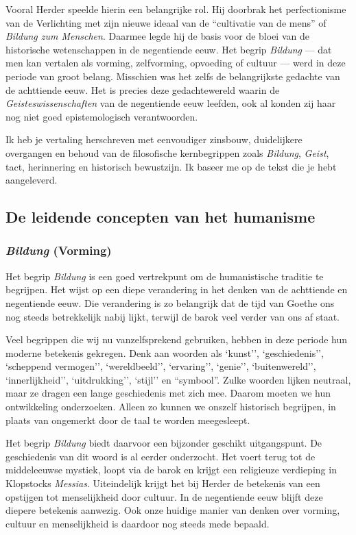 Vooral Herder speelde hierin een belangrijke rol. Hij doorbrak het perfectionisme van de Verlichting met zijn nieuwe ideaal van de ``cultivatie van de mens'' of \textit{Bildung zum Menschen}. Daarmee legde hij de basis voor de bloei van de historische wetenschappen in de negentiende eeuw. Het begrip \textit{Bildung} — dat men kan vertalen als vorming, zelfvorming, opvoeding of cultuur — werd in deze periode van groot belang. Misschien was het zelfs de belangrijkste gedachte van de achttiende eeuw. Het is precies deze gedachtewereld waarin de \textit{Geisteswissenschaften} van de negentiende eeuw leefden, ook al konden zij haar nog niet goed epistemologisch verantwoorden.


Ik heb je vertaling herschreven met eenvoudiger zinsbouw, duidelijkere overgangen en behoud van de filosofische kernbegrippen zoals \textit{Bildung}, \textit{Geist}, tact, herinnering en historisch bewustzijn. Ik baseer me op de tekst die je hebt aangeleverd. 

\subsection{De leidende concepten van het humanisme}

\subsubsection{\textit{Bildung} (Vorming)}

Het begrip \textit{Bildung} is een goed vertrekpunt om de humanistische traditie te begrijpen. Het wijst op een diepe verandering in het denken van de achttiende en negentiende eeuw. Die verandering is zo belangrijk dat de tijd van Goethe ons nog steeds betrekkelijk nabij lijkt, terwijl de barok veel verder van ons af staat.

Veel begrippen die wij nu vanzelfsprekend gebruiken, hebben in deze periode hun moderne betekenis gekregen. Denk aan woorden als `kunst'', `geschiedenis'', `scheppend vermogen'', `wereldbeeld'', `ervaring'', `genie'', `buitenwereld'', `innerlijkheid'', `uitdrukking'', `stijl'' en ``symbool''. Zulke woorden lijken neutraal, maar ze dragen een lange geschiedenis met zich mee. Daarom moeten we hun ontwikkeling onderzoeken. Alleen zo kunnen we onszelf historisch begrijpen, in plaats van ongemerkt door de taal te worden meegesleept.

Het begrip \textit{Bildung} biedt daarvoor een bijzonder geschikt uitgangspunt. De geschiedenis van dit woord is al eerder onderzocht. Het voert terug tot de middeleeuwse mystiek, loopt via de barok en krijgt een religieuze verdieping in Klopstocks \textit{Messias}. Uiteindelijk krijgt het bij Herder de betekenis van een opstijgen tot menselijkheid door cultuur. In de negentiende eeuw blijft deze diepere betekenis aanwezig. Ook onze huidige manier van denken over vorming, cultuur en menselijkheid is daardoor nog steeds mede bepaald.

